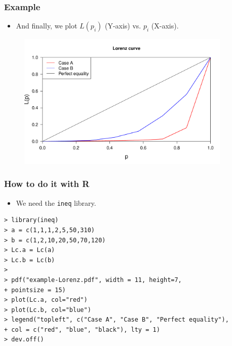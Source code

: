 
\begin{frame}
\frametitle{Example}

\begin{itemize}
  \item And finally, we plot $L(p_i)$ (Y-axis) vs. $p_i$ (X-axis).
\end{itemize}

\begin{figure}
 \includegraphics[height=6.5cm]{figs/example-Lorenz}
\end{figure}

\end{frame}


\begin{frame} [fragile]
\frametitle{How to do it with R}

\begin{itemize}
  \item We need the \texttt{ineq} library.
\end{itemize}

\begin{footnotesize}
\begin{verbatim}
> library(ineq)
> a = c(1,1,1,2,5,50,310)
> b = c(1,2,10,20,50,70,120)
> Lc.a = Lc(a)
> Lc.b = Lc(b)
>
> pdf("example-Lorenz.pdf", width = 11, height=7, 
+ pointsize = 15)
> plot(Lc.a, col="red")
> plot(Lc.b, col="blue")
> legend("topleft", c("Case A", "Case B", "Perfect equality"), 
+ col = c("red", "blue", "black"), lty = 1)
> dev.off()
\end{verbatim}
\end{footnotesize}

\end{frame}


